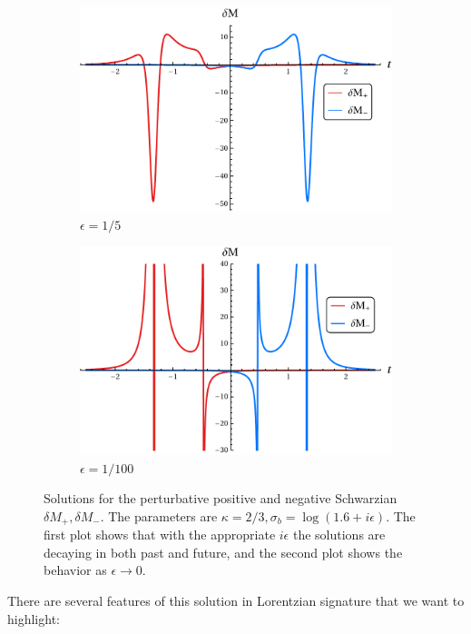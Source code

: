 \documentclass[11pt,oneside,letterpaper]{article}
\numberwithin{equation}{section}
\begin{document}
\begin{spacing}{1.1}
\begin{figure}
\centering
\begin{subfigure}{.5\textwidth}
  \centering
  \includegraphics[width=.9\linewidth]{./figures/two-single-largerep.pdf}
  \caption{$\epsilon= 1/5$}
  \label{fig:sub1}
\end{subfigure}%
\begin{subfigure}{.5\textwidth}
  \centering
  \includegraphics[width=.8\linewidth]{./figures/two-single-smallerepv2.pdf}
  \caption{$\epsilon=1/100$}
  \label{fig:sub2}
\end{subfigure}
\caption{Solutions for the perturbative positive and negative Schwarzian $\delta M_+, \delta M_-$. The parameters are $ \kappa = 2/3, \sigma_b= \log(1.6+ i \epsilon)$. The first plot shows that with the appropriate $i\epsilon$ the solutions are decaying in both past and future, and the second plot shows the behavior as $\epsilon \to 0$.
}
\label{singleintervalplot}
\end{figure}



There are several features of this solution in Lorentzian signature that we want to highlight:


\end{spacing}
\end{document}
